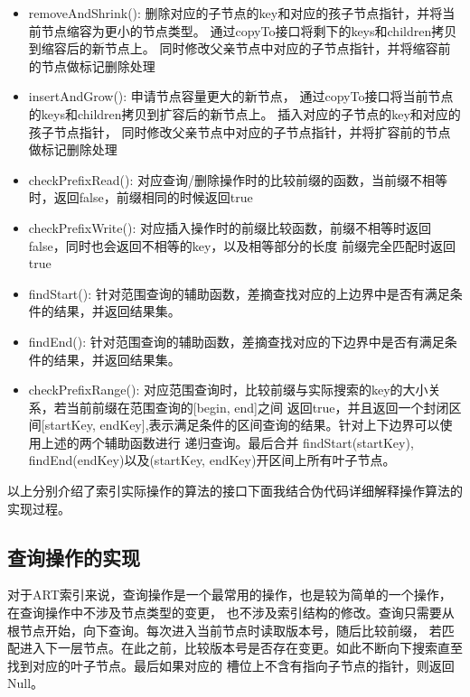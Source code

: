 \begin{itemize}

\item removeAndShrink(): 删除对应的子节点的key和对应的孩子节点指针，并将当前节点缩容为更小的节点类型。
通过copyTo接口将剩下的keys和children拷贝到缩容后的新节点上。
同时修改父亲节点中对应的子节点指针，并将缩容前的节点做标记删除处理

\item insertAndGrow(): 申请节点容量更大的新节点，
通过copyTo接口将当前节点的keys和children拷贝到扩容后的新节点上。
插入对应的子节点的key和对应的孩子节点指针，
同时修改父亲节点中对应的子节点指针，并将扩容前的节点做标记删除处理

\item checkPrefixRead(): 对应查询/删除操作时的比较前缀的函数，当前缀不相等时，返回false，前缀相同的时候返回true

\item checkPrefixWrite(): 对应插入操作时的前缀比较函数，前缀不相等时返回false，同时也会返回不相等的key，以及相等部分的长度
前缀完全匹配时返回true

\item findStart(): 针对范围查询的辅助函数，差摘查找对应的上边界中是否有满足条件的结果，并返回结果集。

\item findEnd(): 针对范围查询的辅助函数，差摘查找对应的下边界中是否有满足条件的结果，并返回结果集。

\item checkPrefixRange(): 对应范围查询时，比较前缀与实际搜索的key的大小关系，若当前前缀在范围查询的[begin, end]之间
返回true，并且返回一个封闭区间[startKey, endKey],表示满足条件的区间查询的结果。针对上下边界可以使用上述的两个辅助函数进行
递归查询。最后合并 findStart(startKey), findEnd(endKey)以及(startKey, endKey)开区间上所有叶子节点。

\end{itemize}

以上分别介绍了索引实际操作的算法的接口下面我结合伪代码详细解释操作算法的实现过程。

\subsection{查询操作的实现}
对于ART索引来说，查询操作是一个最常用的操作，也是较为简单的一个操作，在查询操作中不涉及节点类型的变更，
也不涉及索引结构的修改。查询只需要从根节点开始，向下查询。每次进入当前节点时读取版本号，随后比较前缀，
若匹配进入下一层节点。在此之前，比较版本号是否存在变更。如此不断向下搜索直至找到对应的叶子节点。最后如果对应的
槽位上不含有指向子节点的指针，则返回Null。


